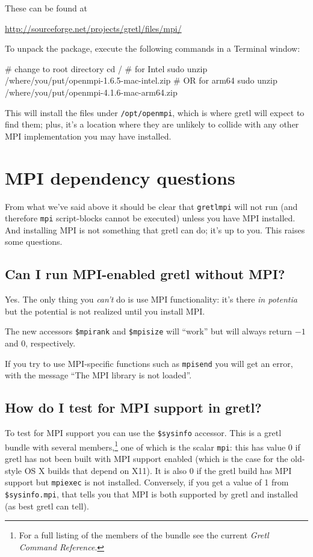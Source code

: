 \documentclass{article}
\begin{document}
These can be found at

\url{http://sourceforge.net/projects/gretl/files/mpi/}

To unpack the package, execute the following commands in a \textsf{Terminal}
window:
\begin{code}
# change to root directory
cd /
# for Intel
sudo unzip /where/you/put/openmpi-1.6.5-mac-intel.zip
# OR for arm64
sudo unzip /where/you/put/openmpi-4.1.6-mac-arm64.zip
\end{code}
%
This will install the files under \texttt{/opt/openmpi}, which is
where gretl will expect to find them; plus, it's a location where they
are unlikely to collide with any other MPI implementation you may have
installed.

\section{MPI dependency questions}
\label{sec:mpi-depend}

From what we've said above it should be clear that \texttt{gretlmpi}
will not run (and therefore \texttt{mpi} script-blocks cannot be
executed) unless you have MPI installed. And installing MPI is not
something that gretl can do; it's up to you. This raises some
questions.

\subsection{Can I run MPI-enabled gretl without MPI?}

Yes. The only thing you \textit{can't} do is use MPI functionality:
it's there \textit{in potentia} but the potential is not realized
until you install MPI.

The new accessors \verb|$mpirank| and \verb|$mpisize| will ``work''
but will always return $-1$ and $0$, respectively.

If you try to use MPI-specific functions such as \texttt{mpisend} you
will get an error, with the message ``The MPI library is not loaded''.

\subsection{How do I test for MPI support in gretl?}
\label{subsec:mpi-test}

To test for MPI support you can use the
\verb|$sysinfo| accessor. This is a gretl bundle with several
members,\footnote{For a full listing of the members of the bundle see
  the current \textit{Gretl Command Reference}.} one of which is the
scalar \texttt{mpi}: this has value 0 if gretl has not been built with
MPI support enabled (which is the case for the old-style OS X builds
that depend on X11). It is also 0 if the gretl build has MPI support
but \texttt{mpiexec} is not installed.  Conversely, if you get a value
of 1 from \verb|$sysinfo.mpi|, that tells you that MPI is both
supported by gretl and installed (as best gretl can tell).
\end{document}
